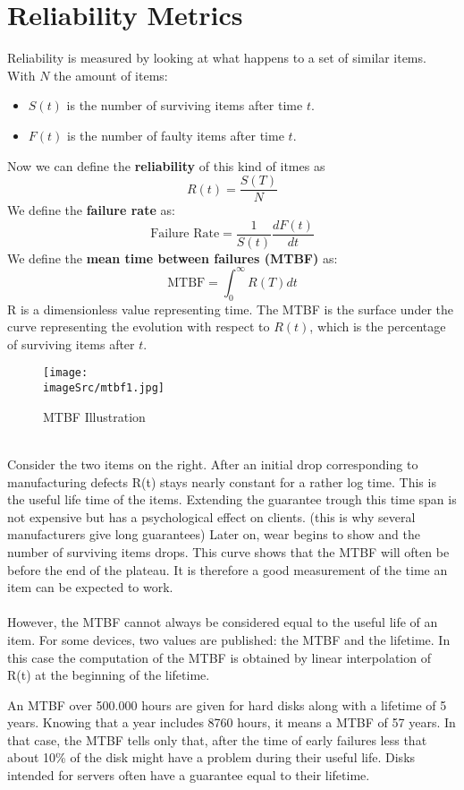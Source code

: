 \documentclass[../main.tex]{subfiles}
\begin{document}
\section{Reliability Metrics}
Reliability is measured by looking at what happens to a set of similar items. With $N$ the amount of items:
\begin{itemize}
	\item $S(t)$ is the number of surviving items after time $t$.
	\item $F(t)$ is the number of faulty items after time $t$.
\end{itemize}
Now we can define the \textbf{reliability} of this kind of itmes as 
\[
R(t) = \frac{S(T)}{N}
\]
We define the \textbf{failure rate} as:
\[
\text{Failure Rate} = \frac{1}{S(t)} \frac{dF(t)}{dt}
\]
We define the \textbf{mean time between failures (MTBF)} as:
\[
\text{MTBF} = \int_0^{\infty} R(T) dt
\]
R is a dimensionless value representing time. The MTBF is the surface under the curve representing the evolution with respect to $R(t)$, which is the percentage of surviving items after $t$.
\begin{figure}[h!]
    \centering
    \texttt{[image: \\imageSrc/mtbf1.jpg]}
    \caption{MTBF Illustration}
    \label{mtbf1}
\end{figure}
\\
Consider the two items on the right. After an initial drop corresponding to manufacturing defects R(t) stays nearly constant for a rather log time. This is the useful life time of the items. Extending the guarantee trough this time span is not expensive but has a psychological effect on clients. (this is why several manufacturers give long guarantees)
Later on, wear begins to show and the number of surviving items drops. This curve shows that the MTBF will often be before the end of the plateau. It is therefore a good measurement of the time an item can be expected to work.
\\\\
However, the MTBF cannot always be considered equal to the useful life of an item. For some devices, two values are published: the MTBF and the lifetime. In this case the computation of the MTBF is obtained by linear interpolation of R(t) at the beginning of the lifetime.

\begin{exmp}
An MTBF over 500.000 hours are given for hard disks along with a lifetime of 5 years. Knowing that a year includes 8760 hours, it means a MTBF of 57 years. In that case, the MTBF tells only that, after the time of early failures less that about 10\% of the disk might have a problem during their useful life. Disks intended for servers often have a guarantee equal to their lifetime.
\end{exmp}
\end{document}
